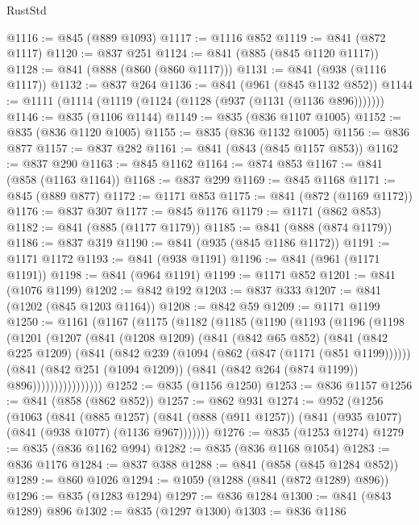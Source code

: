 \begin{lexlean}{RustStd}
\begin{coremodule}
@1116 := @845 (@889 @1093)
@1117 := @1116 @852
@1119 := @841 (@872 @1117)
@1120 := @837 @251
@1124 := @841 (@885 (@845 @1120 @1117))
@1128 := @841 (@888 (@860 (@860 @1117)))
@1131 := @841 (@938 (@1116 @1117))
@1132 := @837 @264
@1136 := @841 (@961 (@845 @1132 @852))
@1144 := @1111 (@1114 (@1119 (@1124 (@1128 (@937 (@1131 (@1136 @896)))))))
@1146 := @835 (@1106 @1144)
@1149 := @835 (@836 @1107 @1005)
@1152 := @835 (@836 @1120 @1005)
@1155 := @835 (@836 @1132 @1005)
@1156 := @836 @877
@1157 := @837 @282
@1161 := @841 (@843 (@845 @1157 @853))
@1162 := @837 @290
@1163 := @845 @1162
@1164 := @874 @853
@1167 := @841 (@858 (@1163 @1164))
@1168 := @837 @299
@1169 := @845 @1168
@1171 := @845 (@889 @877)
@1172 := @1171 @853
@1175 := @841 (@872 (@1169 @1172))
@1176 := @837 @307
@1177 := @845 @1176
@1179 := @1171 (@862 @853)
@1182 := @841 (@885 (@1177 @1179))
@1185 := @841 (@888 (@874 @1179))
@1186 := @837 @319
@1190 := @841 (@935 (@845 @1186 @1172))
@1191 := @1171 @1172
@1193 := @841 (@938 @1191)
@1196 := @841 (@961 (@1171 @1191))
@1198 := @841 (@964 @1191)
@1199 := @1171 @852
@1201 := @841 (@1076 @1199)
@1202 := @842 @192
@1203 := @837 @333
@1207 := @841 (@1202 (@845 @1203 @1164))
@1208 := @842 @59
@1209 := @1171 @1199
@1250 := @1161
    (@1167
      (@1175
        (@1182
          (@1185
            (@1190
              (@1193
                (@1196
                  (@1198
                    (@1201
                      (@1207
                        (@841
                          (@1208 @1209)
                          (@841
                            (@842 @65 @852)
                            (@841
                              (@842 @225 @1209)
                              (@841
                                (@842 @239 (@1094 (@862 (@847 (@1171 (@851 @1199))))))
                                (@841
                                  (@842 @251 (@1094 @1209))
                                  (@841 (@842 @264 (@874 @1199)) @896))))))))))))))))
@1252 := @835 (@1156 @1250)
@1253 := @836 @1157
@1256 := @841 (@858 (@862 @852))
@1257 := @862 @931
@1274 := @952
    (@1256
      (@1063
        (@841
          (@885 @1257)
          (@841 (@888 (@911 @1257)) (@841 (@935 @1077) (@841 (@938 @1077) (@1136 @967)))))))
@1276 := @835 (@1253 @1274)
@1279 := @835 (@836 @1162 @994)
@1282 := @835 (@836 @1168 @1054)
@1283 := @836 @1176
@1284 := @837 @388
@1288 := @841 (@858 (@845 @1284 @852))
@1289 := @860 @1026
@1294 := @1059 (@1288 (@841 (@872 @1289) @896))
@1296 := @835 (@1283 @1294)
@1297 := @836 @1284
@1300 := @841 (@843 @1289) @896
@1302 := @835 (@1297 @1300)
@1303 := @836 @1186

\end{coremodule}
\end{lexlean}
